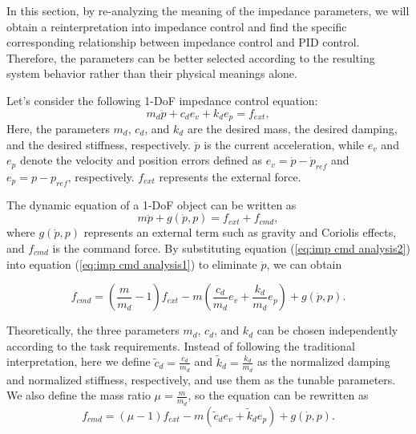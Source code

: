In this section, by re-analyzing the meaning of the impedance parameters, we will obtain a reinterpretation into impedance control and find the specific corresponding relationship between impedance control and PID control. Therefore, the parameters can be better selected according to the resulting system behavior rather than their physical meanings alone.





Let's consider the following 1-DoF impedance control equation:
\begin{equation}
\label{eq:imp cmd analysis1}
  m_d\ddot{p}+c_de_v+k_de_p = f_{ext},
\end{equation}
Here, the parameters $m_d$, $c_d$, and $k_d$ are the desired mass, the desired damping, and the desired stiffness, respectively. $\ddot{p}$ is the current acceleration, while $e_v$ and $e_p$ denote the velocity and position errors defined as $e_v = \dot{p}-\dot{p}_{ref}$ and $e_p = p-p_{ref}$, respectively. $f_{ext}$ represents the external force.


The dynamic equation of a 1-DoF object can be written as
\begin{equation}
\label{eq:imp cmd analysis2}
  m\ddot{p}+g(\dot{p}, p) = f_{ext} + f_{cmd},
\end{equation}
where $g(\dot{p}, p)$ represents an external term such as gravity and Coriolis effects, and $f_{cmd}$ is the command force.
By substituting equation (\ref{eq:imp cmd analysis2}) into equation (\ref{eq:imp cmd analysis1}) to eliminate $\ddot{p}$, we can obtain

\begin{equation}
\label{eq:imp cmd analysis3}
{{f}_{cmd}}=(\frac{m}{m_d}-1){{f}_{ext}}-m({\frac{c_d}{m_d}e_v+\frac{k_d}{m_d}e_p})+g(\dot{p}, p).
\end{equation}

Theoretically, the three parameters $m_d$, $c_d$, and $k_d$ can be chosen independently according to the task requirements. Instead of following the traditional interpretation, here we define $\tilde{c}_d = \frac{c_d}{m_d}$ and $\tilde{k}_d = \frac{k_d}{m_d}$ as the normalized damping and normalized stiffness, respectively, and use them as the tunable parameters. We also define the mass ratio $\mu=\frac{m}{m_d}$, so the equation can be rewritten as
\begin{equation}
\label{eq:imp cmd analysis4}
{{f}_{cmd}}=(\mu-1){{f}_{ext}}-m({\tilde{c}_de_v+\tilde{k}_de_p})+g(\dot{p}, p).
\end{equation}


